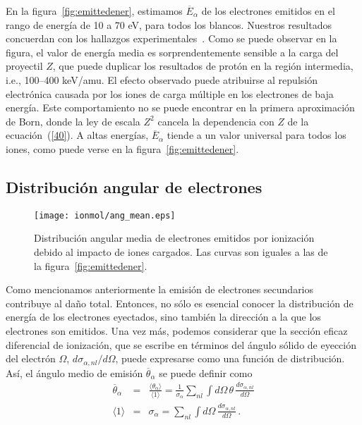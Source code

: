 En la figura~\ref{fig:emittedener}, estimamos $\overline{E}_{\alpha}$ de
los electrones emitidos en el rango de energía de 10 a 70 eV, para 
todos los blancos. Nuestros resultados concuerdan con los hallazgos 
experimentales~\cite{surdutovic2018}. Como se puede observar en la 
figura, el valor de energía media es sorprendentemente sensible a la 
carga del proyectil $Z$, que puede duplicar los resultados de protón en 
la región intermedia, i.e., 100--400 keV/amu. El efecto observado puede 
atribuirse al repulsión electrónica causada por los iones de carga 
múltiple en los electrones de baja energía. Este comportamiento no se 
puede encontrar en la primera aproximación de Born, donde la ley de
escala $Z^2$ cancela la dependencia con $Z$ de la ecuación~(\ref{40}).
A altas energías, $\overline{E}_{\alpha}$ tiende a un valor universal
para todos los iones, como puede verse en la figura~\ref{fig:emittedener}.

\subsection{Distribución angular de electrones}
\label{subsec:meanang}

\begin{figure*}[t!]
\centering
\texttt{[image: ionmol/ang\_mean.eps]}
\caption[Distribución angular media de electrones emitidos.]
{Distribución angular media de electrones emitidos por ionización debido
al impacto de iones cargados. Las curvas son iguales a las de la 
figura~\ref{fig:emittedener}.}
\label{fig:emittedang}
\end{figure*} 

Como mencionamos anteriormente la emisión de electrones secundarios
contribuye al daño total. Entonces, no sólo es esencial conocer la 
distribución de energía de los electrones eyectados, sino también la 
dirección a la que los electrones son emitidos. Una vez más, podemos
considerar que la sección eficaz diferencial de ionización, que se 
escribe en términos del ángulo sólido de eyección del electrón $\Omega$, 
$d\sigma_{\alpha,nl}/d\Omega$, puede expresarse como una función de 
distribución. Así, el ángulo medio de emisión $\overline{\theta}_{\alpha}$ 
se puede definir como
\begin{eqnarray}
\overline{\theta}_{\alpha}&=&\frac{\langle\theta_{\alpha}\rangle}
{\langle 1\rangle}=\frac{1}{\sigma_{\alpha}}\sum\limits_{nl}
\int d\Omega\,\theta\,\frac{d\sigma_{\alpha,nl}}{d\Omega} \\
\langle 1\rangle &=&\sigma_{\alpha}=\sum\limits_{nl}\int d\Omega\,
\frac{d\sigma_{\alpha,nl}}{d\Omega}\,.
\end{eqnarray}

